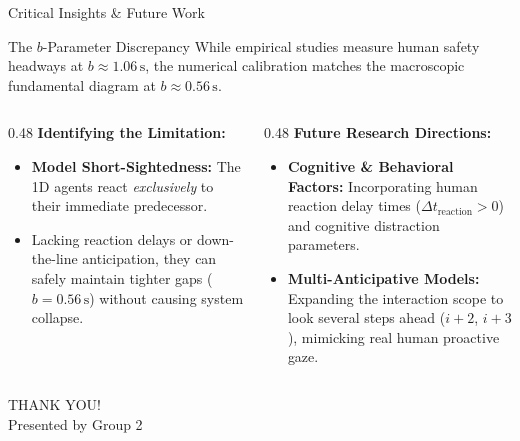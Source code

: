 \documentclass{beamer}
\begin{document}
\begin{frame}{Critical Insights \& Future Work}
\small
\raggedright

\begin{alertblock}{The $b$-Parameter Discrepancy}
    While empirical studies measure human safety headways at $b \approx 1.06\,\mathrm{s}$, the numerical calibration matches the macroscopic fundamental diagram at $b \approx 0.56\,\mathrm{s}$.
\end{alertblock}

\vspace{0.15cm}

\begin{columns}[T,onlytextwidth]
    \begin{column}{0.48\textwidth}
        \textbf{Identifying the Limitation:}
        \begin{itemize}
            \item \textbf{Model Short-Sightedness:} The 1D agents react \emph{exclusively} to their immediate predecessor.
            \item Lacking reaction delays or down-the-line anticipation, they can safely maintain tighter gaps ($b = 0.56\,\mathrm{s}$) without causing system collapse.
        \end{itemize}
    \end{column}

    \begin{column}{0.48\textwidth}
        \textbf{Future Research Directions:}
        \begin{itemize}
            \item \textbf{Cognitive \& Behavioral Factors:} Incorporating human reaction delay times ($\Delta t_{\mathrm{reaction}} > 0$) and cognitive distraction parameters.
            \item \textbf{Multi-Anticipative Models:} Expanding the interaction scope to look several steps ahead ($i+2$, $i+3$), mimicking real human proactive gaze.
        \end{itemize}
    \end{column}
\end{columns}
\end{frame}

\begin{frame}
    \begin{center}
        \Huge THANK YOU!
        \vspace{0.5cm}
        \normalsize \\ Presented by Group 2
    \end{center}
\end{frame}
\end{document}
